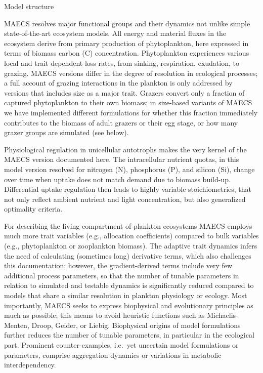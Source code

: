 \begin{subsection}{Model structure}

MAECS resolves major functional groups and their dynamics not unlike simple state-of-the-art ecosystem models. All energy and material fluxes in the ecosystem derive from primary production of phytoplankton, here expressed in terms of biomass carbon (C) concentration. Phytoplankton experiences various local and trait dependent loss rates, from sinking, respiration, exudation, to grazing. 
MAECS versions differ in the degree of resolution in ecological processes; a full account of grazing interactions in the plankton is only addressed by versions that includes size as a major trait. Grazers convert only a fraction of captured phytoplankton to their own biomass; in size-based variants of MAECS we have implemented different formulations for whether this fraction immediately contributes to the biomass of adult grazers or their egg stage, or how many grazer groups are simulated (see below).

Physiological regulation in unicellular autotrophs makes the very kernel of the MAECS version documented here. 
The intracellular nutrient quotas, in this model version resolved for nitrogen (N), phosphorus (P), and silicon (Si), change over time when uptake does not match demand due to biomass build-up. Differential uptake regulation then leads to highly variable stoichiometries, that not only reflect ambient nutrient and light concentration, but also generalized optimality criteria.

For describing the living compartment of plankton ecosystems MAECS employs much more trait variables (e.g., allocation coefficients) compared to bulk variables (e.g., phytoplankton or zooplankton biomass). The adaptive trait dynamics infers the need of calculating (sometimes long) derivative terms, which also challenges this documentation; however, the gradient-derived terms include very few  additional process parameters, so that the number of tunable parameters in relation to simulated and testable dynamics is significantly reduced compared to models that share a similar resolution in plankton physiology or ecology. Most importantly, MAECS seeks to express biophysical and evolutionary principles as much as possible; this means to avoid heuristic functions such as Michaelis-Menten, Droop, Geider, or Liebig. Biophysical origins of model formulations further reduces the number of tunable parameters, in particular in the ecological part. Prominent counter-examples, i.e.~yet uncertain model formulations or parameters, comprise aggregation dynamics or variations in metabolic interdependency. 

\end{subsection}

